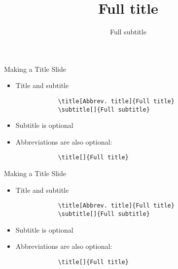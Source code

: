 \begin{frame}[fragile,t]{Making a Title Slide}
	\begin{itemize}
		\item Title and subtitle
		\begin{verbatim}
			\title[Abbrev. title]{Full title}
			\subtitle[]{Full subtitle}
		\end{verbatim}
\vspace{0.2in}
		\item Subtitle is optional
		\item Abbreviations are also optional:
		\begin{verbatim}
			\title[]{Full title}
		\end{verbatim}
	\end{itemize}
\end{frame}

\title[Abbrev. Title]{Full title} 
\subtitle[]{Full subtitle} 
\author{}
\institute{} 
\date{} 
\frame{\titlepage}

\begin{frame}[fragile,t]{Making a Title Slide}
	\begin{itemize}
		\item Title and subtitle
		\begin{verbatim}
			\title[Abbrev. title]{Full title}
			\subtitle[]{Full subtitle}
		\end{verbatim}
\vspace{0.2in}
		\item Subtitle is optional
		\item Abbreviations are also optional:
		\begin{verbatim}
			\title[]{Full title}
		\end{verbatim}
	\end{itemize}
\end{frame}

